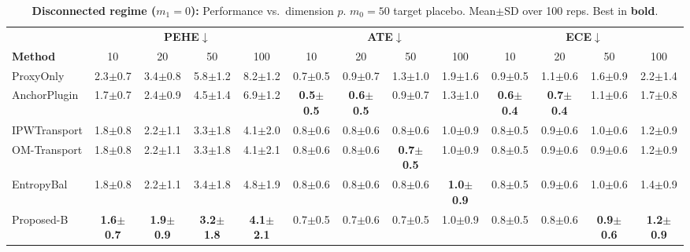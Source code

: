 \begin{table}[t]
\centering
\tiny
\setlength{\tabcolsep}{2pt}
\renewcommand{\arraystretch}{1.1}
\begin{tabular}{@{}l|cccc|cccc|cccc@{}}
\hline
& \multicolumn{4}{c|}{\textbf{PEHE$\downarrow$}} & \multicolumn{4}{c|}{\textbf{ATE$\downarrow$}} & \multicolumn{4}{c}{\textbf{ECE$\downarrow$}} \\
\textbf{Method} & 10 & 20 & 50 & 100 & 10 & 20 & 50 & 100 & 10 & 20 & 50 & 100 \\
\hline
ProxyOnly & 2.3{\tiny$\pm$0.7} & 3.4{\tiny$\pm$0.8} & 5.8{\tiny$\pm$1.2} & 8.2{\tiny$\pm$1.2} & 0.7{\tiny$\pm$0.5} & 0.9{\tiny$\pm$0.7} & 1.3{\tiny$\pm$1.0} & 1.9{\tiny$\pm$1.6} & 0.9{\tiny$\pm$0.5} & 1.1{\tiny$\pm$0.6} & 1.6{\tiny$\pm$0.9} & 2.2{\tiny$\pm$1.4} \\
AnchorPlugin & 1.7{\tiny$\pm$0.7} & 2.4{\tiny$\pm$0.9} & 4.5{\tiny$\pm$1.4} & 6.9{\tiny$\pm$1.2} & \textbf{0.5{\tiny$\pm$0.5}} & \textbf{0.6{\tiny$\pm$0.5}} & 0.9{\tiny$\pm$0.7} & 1.3{\tiny$\pm$1.0} & \textbf{0.6{\tiny$\pm$0.4}} & \textbf{0.7{\tiny$\pm$0.4}} & 1.1{\tiny$\pm$0.6} & 1.7{\tiny$\pm$0.8} \\
IPWTransport & 1.8{\tiny$\pm$0.8} & 2.2{\tiny$\pm$1.1} & 3.3{\tiny$\pm$1.8} & 4.1{\tiny$\pm$2.0} & 0.8{\tiny$\pm$0.6} & 0.8{\tiny$\pm$0.6} & 0.8{\tiny$\pm$0.6} & 1.0{\tiny$\pm$0.9} & 0.8{\tiny$\pm$0.5} & 0.9{\tiny$\pm$0.6} & 1.0{\tiny$\pm$0.6} & 1.2{\tiny$\pm$0.9} \\
OM-Transport & 1.8{\tiny$\pm$0.8} & 2.2{\tiny$\pm$1.1} & 3.3{\tiny$\pm$1.8} & 4.1{\tiny$\pm$2.1} & 0.8{\tiny$\pm$0.6} & 0.8{\tiny$\pm$0.6} & \textbf{0.7{\tiny$\pm$0.5}} & 1.0{\tiny$\pm$0.9} & 0.8{\tiny$\pm$0.5} & 0.9{\tiny$\pm$0.6} & 0.9{\tiny$\pm$0.6} & 1.2{\tiny$\pm$0.9} \\
EntropyBal & 1.8{\tiny$\pm$0.8} & 2.2{\tiny$\pm$1.1} & 3.4{\tiny$\pm$1.8} & 4.8{\tiny$\pm$1.9} & 0.8{\tiny$\pm$0.6} & 0.8{\tiny$\pm$0.6} & 0.8{\tiny$\pm$0.6} & \textbf{1.0{\tiny$\pm$0.9}} & 0.8{\tiny$\pm$0.5} & 0.9{\tiny$\pm$0.6} & 1.0{\tiny$\pm$0.6} & 1.4{\tiny$\pm$0.9} \\
Proposed-B & \textbf{1.6{\tiny$\pm$0.7}} & \textbf{1.9{\tiny$\pm$0.9}} & \textbf{3.2{\tiny$\pm$1.8}} & \textbf{4.1{\tiny$\pm$2.1}} & 0.7{\tiny$\pm$0.5} & 0.7{\tiny$\pm$0.6} & 0.7{\tiny$\pm$0.5} & 1.0{\tiny$\pm$0.9} & 0.8{\tiny$\pm$0.5} & 0.8{\tiny$\pm$0.6} & \textbf{0.9{\tiny$\pm$0.6}} & \textbf{1.2{\tiny$\pm$0.9}} \\
\hline
\end{tabular}
\caption{
\textbf{Disconnected regime ($m_1=0$):} Performance vs.\ dimension $p$.
$m_0=50$ target placebo. Mean{\tiny$\pm$SD} over 100 reps. Best in \textbf{bold}.
}
\label{tab:disconnected-m10}
\end{table}